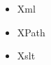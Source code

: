 \documentclass[10pt]{article}
\begin{document}


\begin{itemize}
\item Xml
\item XPath
\item Xslt
\end{itemize}
\end{document}
